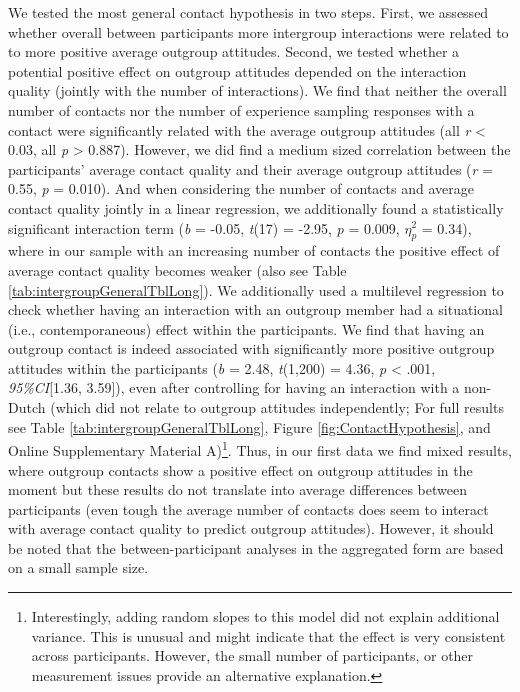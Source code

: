 We tested the most general contact hypothesis in two steps. First, we
assessed whether overall between participants more intergroup
interactions were related to to more positive average outgroup
attitudes. Second, we tested whether a potential positive effect on
outgroup attitudes depended on the interaction quality (jointly with the
number of interactions). We find that neither the overall number of
contacts nor the number of experience sampling responses with a contact
were significantly related with the average outgroup attitudes (all
\textbar{} \textit{r} \textbar{} \textless{} 0.03, all \textit{p}
\textgreater{} 0.887). However, we did find a medium sized correlation
between the participants' average contact quality and their average
outgroup attitudes (\textit{r} = 0.55, \textit{p} = 0.010). And when
considering the number of contacts and average contact quality jointly
in a linear regression, we additionally found a statistically
significant interaction term (\textit{b} = -0.05, \textit{t}(17) =
-2.95, \textit{p} = 0.009, \(\eta_p^2\) = 0.34), where in our sample
with an increasing number of contacts the positive effect of average
contact quality becomes weaker (also see Table
\ref{tab:intergroupGeneralTblLong}). We additionally used a multilevel
regression to check whether having an interaction with an outgroup
member had a situational (i.e., contemporaneous) effect within the
participants. We find that having an outgroup contact is indeed
associated with significantly more positive outgroup attitudes within
the participants (\textit{b} = 2.48, \textit{t}(1,200) = 4.36,
\textit{p} \textless{} .001, \textit{95\%CI}{[}1.36, 3.59{]}), even
after controlling for having an interaction with a non-Dutch (which did
not relate to outgroup attitudes independently; For full results see
Table \ref{tab:intergroupGeneralTblLong}, Figure
\ref{fig:ContactHypothesis}, and Online Supplementary Material
A)\footnote{Interestingly, adding random slopes to this model did not explain additional variance. This is unusual and might indicate that the effect is very consistent across participants. However, the small number of participants, or other measurement issues provide an alternative explanation.}.
Thus, in our first data we find mixed results, where outgroup contacts
show a positive effect on outgroup attitudes in the moment but these
results do not translate into average differences between participants
(even tough the average number of contacts does seem to interact with
average contact quality to predict outgroup attitudes). However, it
should be noted that the between-participant analyses in the aggregated
form are based on a small sample size.

